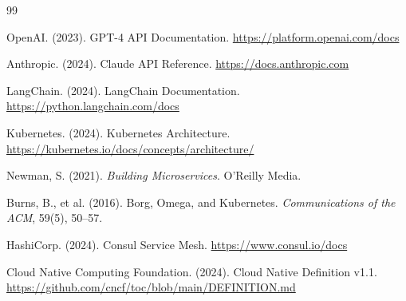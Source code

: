 \begin{thebibliography}{99}

OpenAI. (2023). GPT-4 API Documentation.
\url{https://platform.openai.com/docs}

Anthropic. (2024). Claude API Reference.
\url{https://docs.anthropic.com}

LangChain. (2024). LangChain Documentation.
\url{https://python.langchain.com/docs}

Kubernetes. (2024). Kubernetes Architecture.
\url{https://kubernetes.io/docs/concepts/architecture/}

Newman, S. (2021). \emph{Building Microservices}. O'Reilly Media.

Burns, B., et al. (2016). Borg, Omega, and Kubernetes. \emph{Communications of the ACM}, 59(5), 50--57.

HashiCorp. (2024). Consul Service Mesh.
\url{https://www.consul.io/docs}

Cloud Native Computing Foundation. (2024). Cloud Native Definition v1.1.
\url{https://github.com/cncf/toc/blob/main/DEFINITION.md}

\end{thebibliography}
